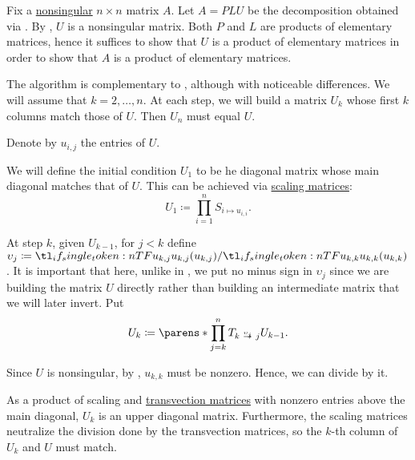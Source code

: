 \begin{algorithm}\label{alg:elementary_matrix_decomposition}
  Fix a \hyperref[def:inverse_matrix]{nonsingular} \( n \times n \) matrix \( A \). Let \( A = PLU \) be the decomposition obtained via . By , \( U \) is a nonsingular matrix. Both \( P \) and \( L \) are products of elementary matrices, hence it suffices to show that \( U \) is a product of elementary matrices in order to show that \( A \) is a product of elementary matrices.

  The algorithm is complementary to , although with noticeable differences. We will assume that \( k = 2, \ldots, n \). At each step, we will build a matrix \( U_k \) whose first \( k \) columns match those of \( U \). Then \( U_n \) must equal \( U \).

  Denote by \( u_{i,j} \) the entries of \( U \).

  \begin{thmenum}
     We will define the initial condition \( U_1 \) to be he diagonal matrix whose main diagonal matches that of \( U \). This can be achieved via \hyperref[def:elementary_matrix/scaling]{scaling matrices}:
    \begin{equation*}
      U_1 \coloneqq \prod_{i=1}^n S_{i \mapsto u_{i,i}}.
    \end{equation*}

     At step \( k \), given \( U_{k-1} \), for \( j < k \) define \( \upsilon_j \coloneqq \ifrac {u_{k,j}} {u_{k,k}} \). It is important that here, unlike in , we put no minus sign in \( \upsilon_j \) since we are building the matrix \( U \) directly rather than building an intermediate matrix that we will later invert. Put
    \begin{equation*}
      U_k \coloneqq \parens*{ \prod_{j=k}^n T_{k \reloset {\upsilon_j} \to j} } U_{k-1}.
    \end{equation*}

    Since \( U \) is nonsingular, by , \( u_{k,k} \) must be nonzero. Hence, we can divide by it.

    As a product of scaling and \hyperref[def:elementary_matrix/transvection]{transvection matrices} with nonzero entries above the main diagonal, \( U_k \) is an upper diagonal matrix. Furthermore, the scaling matrices neutralize the division done by the transvection matrices, so the \( k \)-th column of \( U_k \) and \( U \) must match.
  \end{thmenum}
\end{algorithm}

